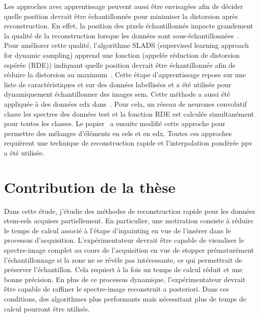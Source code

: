 Les approches avec apprentissage peuvent aussi être envisagées afin de décider quelle position devrait être échantillonnée pour minimiser la distorsion après reconstruction. En effet, la position des pixels échantillonnés impacte grandement la qualité de la reconstruction lorsque les données sont sous-échantillonnées~\cite{trampert2018ultramicroscopy}. Pour améliorer cette qualité, l'algorithme SLADS (supervised learning approach for dynamic sampling) apprend une fonction (appelée réduction de distorsion espérée (RDE)) indiquant quelle position devrait être échantillonnée afin de réduire la distorsion au maximum~\cite{godaliyadda2018tci}. Cette étape d'apprentissage repose sur une liste de caractéristiques et sur des données labellisées et a été utilisée pour dynamiquement échantillonner des images \gls{sem}.
%
Cette méthode a aussi été appliquée à des données \gls{edx} dans~\cite{zhang2018reduced}. Pour cela, un réseau de neurones convolutif classe les spectres des données test et la fonction RDE est calculée simultanément pour toutes les classes. %
%
Le papier~\cite{hujsak2018high} a ensuite modifié cette approche pour permettre des mélanges d'éléments en \gls{eels} et en \gls{edx}. Toutes ces approches requièrent une technique de reconstruction rapide et l'interpolation pondérée \gls{ppv} a été utilisée.



%
\section{Contribution de la thèse}

\begin{mylandscape}
    \begin{normaltable}[]
        \centering
        
        \caption{Comparaison des méthodes proposées dans la littérature en microscopie pour le reconstruction d'images partiellement échantillonnées. Des références supplémentaires n'étant pas issues de la littérature en microscopie sont données en italique. Le temps d'exécution et la précision sont évaluées qualitativement en se basant sur les résultats des chapitres suivants.%
            \protect\label{tab-litterature}}
    \end{normaltable}
\end{mylandscape}

Dans cette étude, j'étudie des méthodes de reconstruction rapide pour les données \gls{stem}-\gls{eels} acquises partiellement. En particulier, une motivation consiste à réduire le temps de calcul associé à l'étape d'inpainting en vue de l'insérer dans le processus d'acquisition. L'expérimentateur devrait être capable de visualiser le spectre-image complet au cours de l'acquisition en vue de stopper prématurément l'échantillonnage si la zone ne se révèle pas intéressante, ce qui permettrait de préserver l'échantillon. Cela requiert à la fois un temps de calcul réduit et une bonne précision. En plus de ce processus dynamique, l'expérimentateur devrait être capable de raffiner le spectre-image reconstruit a posteriori. Dans ces conditions, des algorithmes plus performants mais nécessitant plus de temps de calcul pourront être utilisés. 


